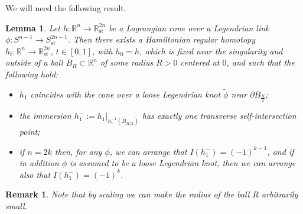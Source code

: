 \documentclass[reqno,11pt]{amsart}
\numberwithin{equation}{section}
\theoremstyle{my}
\theoremstyle{my}
\newtheorem{Lemma}[thm]{Lemma}
\theoremstyle{your}
\newtheorem{Remark}[thm]{Remark}
\newcommand{\R}{\mathbb{R}}
\newcommand{\st}{\mathrm{st}}
\newcommand{\p}{\partial }
\newcommand{\wt}{\widetilde}
\begin{document}
We will need the following result. 
\begin{Lemma}\label{lm:near-cone}
Let $h\colon\R^n\to\R^{2n}_\st$ be a Lagrangian cone over a Legendrian link $\phi\colon S^{n-1}\to S^{2n-1}_\st$. Then there exists a Hamiltonian regular homotopy $h_t\colon\R^n\to\R^{2n}_\st$, $t\in[0,1]$, with $h_0=h$,  which is fixed near the singularity and outside of a ball $B_R\subset\R^{n}$ of some radius $R>0$ centered at $0$, and such that the following hold:
\begin{itemize}
 \item $h_1$ coincides with the cone over a loose Legendrian knot $\wt\phi$  near $\p B_{\frac R2}$;
 \item the immersion $ h_1^-:=h_1|_{h_1^{-1}( B_{R/2}) }$
 has exactly one transverse self-intersection point;
 \item if $n=2k$ then, for any $\phi$, we can arrange that $I(h_1^-) =(-1)^{k-1}$, and if in addition $\phi$ is assumed to be a loose Legendrian knot, then we can arrange also that 
$I(h_1^-)=(-1)^{k}$.
   \end{itemize}
\end{Lemma}

\begin{Remark} 
Note that by scaling we can make the radius of the ball $R$ arbitrarily small.
\end{Remark}
 
\end{document}
